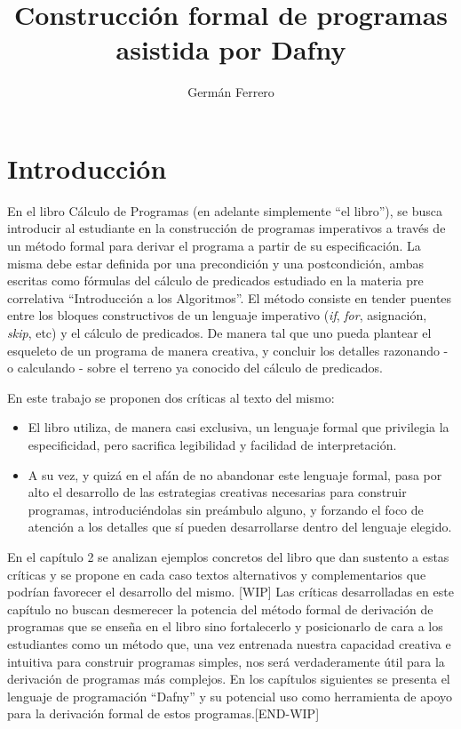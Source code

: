 \documentclass[11pt, a4paper, openany]{book}
\author{Germán Ferrero}
\title{Construcción formal de programas asistida por Dafny}
\begin{document}
    \chapter{Introducción}
    En el libro Cálculo de Programas (en adelante simplemente ``el libro''), se busca introducir al estudiante en la construcción de programas imperativos a través de un método formal para derivar el programa a partir de su especificación. La misma debe estar definida por una precondición y una postcondición, ambas escritas como fórmulas del cálculo de predicados estudiado en la materia pre correlativa ``Introducción a los Algoritmos''. El método consiste en tender puentes entre los bloques constructivos de un lenguaje imperativo (\textit{if}, \textit{for}, asignación, \textit{skip}, etc) y el cálculo de predicados. De manera tal que uno pueda plantear el esqueleto de un programa de manera creativa, y concluir los detalles razonando - o calculando - sobre el terreno ya conocido del cálculo de predicados.

    En este trabajo se proponen dos críticas al texto del mismo:
    \begin{itemize}
    \item El libro utiliza, de manera casi exclusiva, un lenguaje formal que privilegia la especificidad, pero sacrifica legibilidad y facilidad de interpretación.
    \item A su vez, y quizá en el afán de no abandonar este lenguaje formal, pasa por alto el desarrollo de las estrategias creativas necesarias para construir programas, introduciéndolas sin preámbulo alguno, y forzando el foco de atención a los detalles que sí pueden desarrollarse dentro del lenguaje elegido.
    \end{itemize}

    En el capítulo 2 se analizan ejemplos concretos del libro que dan sustento a estas críticas y se propone en cada caso textos alternativos y complementarios que podrían favorecer el desarrollo del mismo.
    [WIP] Las críticas desarrolladas en este capítulo no buscan desmerecer la potencia del método formal de derivación de programas que se enseña en el libro sino fortalecerlo y posicionarlo de cara a los estudiantes como un método que, una vez entrenada nuestra capacidad creativa e intuitiva para construir programas simples, nos será verdaderamente útil para la derivación de programas más complejos.
    En los capítulos siguientes se presenta el lenguaje de programación ``Dafny'' y su potencial uso como herramienta de apoyo para la derivación formal de estos programas.[END-WIP]
\end{document}
